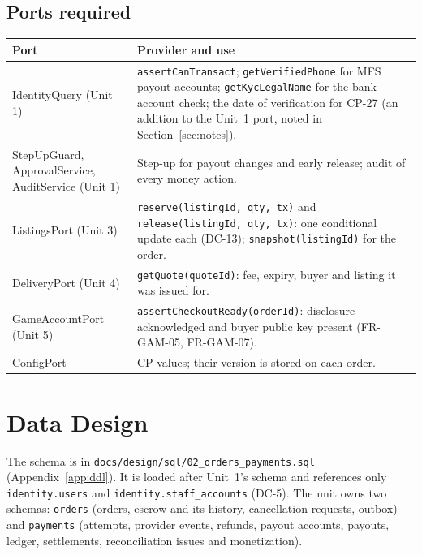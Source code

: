 \documentclass[11pt,a4paper]{article}
\newenvironment{dtable}[1]{\small\begin{longtable}{#1}}{\end{longtable}}
\begin{document}
\subsection{Ports required}
\begin{dtable}{@{}>{\ttfamily}p{4.4cm}>{\raggedright\arraybackslash}p{10.8cm}@{}}
\toprule
\textnormal{\textbf{Port}} & \textbf{Provider and use} \\ \midrule \endhead
IdentityQuery (Unit 1) & \texttt{assertCanTransact}; \texttt{getVerifiedPhone} for MFS payout accounts; \texttt{getKycLegalName} for the bank-account check; the date of verification for CP-27 (an addition to the Unit~1 port, noted in Section~\ref{sec:notes}). \\
StepUpGuard, ApprovalService, AuditService (Unit 1) & Step-up for payout changes and early release; audit of every money action. \\
ListingsPort (Unit 3) & \texttt{reserve(listingId, qty, tx)} and \texttt{release(listingId, qty, tx)}: one conditional update each (DC-13); \texttt{snapshot(listingId)} for the order. \\
DeliveryPort (Unit 4) & \texttt{getQuote(quoteId)}: fee, expiry, buyer and listing it was issued for. \\
GameAccountPort (Unit 5) & \texttt{assertCheckoutReady(orderId)}: disclosure acknowledged and buyer public key present (FR-GAM-05, FR-GAM-07). \\
ConfigPort & CP values; their version is stored on each order. \\
\bottomrule
\end{dtable}
\section{Data Design}
\label{sec:data}
The schema is in \texttt{docs/design/sql/02\_orders\_payments.sql} (Appendix~\ref{app:ddl}). It is loaded after Unit~1's schema and references only \texttt{identity.users} and \texttt{identity.staff\_accounts} (DC-5). The unit owns two schemas: \texttt{orders} (orders, escrow and its history, cancellation requests, outbox) and \texttt{payments} (attempts, provider events, refunds, payout accounts, payouts, ledger, settlements, reconciliation issues and monetization).

\newcommand{\ent}[2]{\textbf{\color{headcolor}#1}\\[-1pt]{\ttfamily\tiny #2}}
\end{document}
